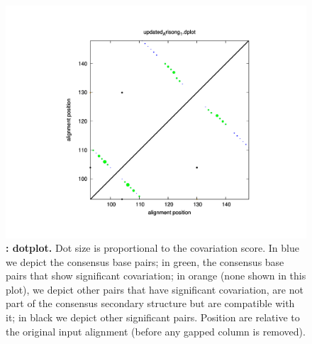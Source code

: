 \begin{figure}[h] 
\includegraphics[scale=0.60]{Arisong_dplot.pdf} 
 \caption{\small\textbf{:
   dotplot.}  Dot size is proportional to the covariation score. In
   blue we depict the consensus base pairs; in green, the consensus
   base pairs that show significant covariation; in orange (none shown
   in this plot), we depict other pairs that have significant
   covariation, are not part of the consensus secondary structure but
   are compatible with it; in black we depict other significant pairs.
   Position are relative to the original input alignment (before any
   gapped column is removed).}
\label{fig:dplot} 
\end{figure}



 

